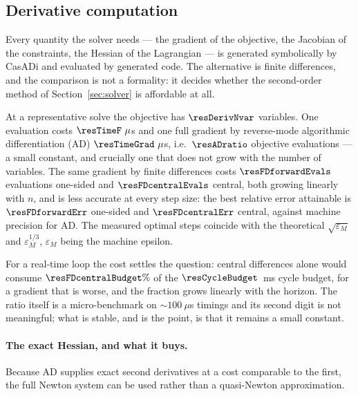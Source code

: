 \documentclass[11pt,a4paper]{article}
\begin{document}
\subsection{Derivative computation}
\label{sec:deriv}

Every quantity the solver needs --- the gradient of the objective, the Jacobian of the constraints, the
Hessian of the Lagrangian --- is generated symbolically by CasADi and evaluated by generated code. The
alternative is finite differences, and the comparison is not a formality: it decides whether the second-order
method of Section~\ref{sec:solver} is affordable at all.

\begin{table}[htbp]
  \centering
  \small
  \caption{Accuracy of the finite-difference gradient against the step size, measured against the AD gradient. The optimum sits at $h=1.49\times 10^{-8}$ one-sided (theory: $\sqrt{\varepsilon}=1.49\times 10^{-8}$) and $h=6.06\times 10^{-6}$ central (theory: $\varepsilon^{1/3}=6.06\times 10^{-6}$).}
  \label{res:tab:fd}
\end{table}

At a representative solve the objective has $\resDerivNvar$ variables. One evaluation costs
$\resTimeF~\mu$s and one full gradient by reverse-mode algorithmic differentiation (AD) $\resTimeGrad~\mu$s,
i.e.\ $\resADratio$ objective evaluations --- a small constant, and crucially one that does not grow with the
number of variables. The same gradient by finite differences costs $\resFDforwardEvals$ evaluations one-sided
and $\resFDcentralEvals$ central, both growing linearly with $n$, and is less accurate at every step size:
the best relative error attainable is $\resFDforwardErr$ one-sided and $\resFDcentralErr$ central, against
machine precision for AD. The measured optimal steps coincide with the theoretical $\sqrt{\varepsilon_M}$ and
$\varepsilon_M^{1/3}$, $\varepsilon_M$ being the machine epsilon.

For a real-time loop the cost settles the question: central differences alone would consume
$\resFDcentralBudget\%$ of the $\resCycleBudget$~ms cycle budget, for a gradient that is worse, and the
fraction grows linearly with the horizon. The ratio itself is a micro-benchmark on
$\sim\!100~\mu$s timings and its second digit is not meaningful; what is stable, and is the point, is that it
remains a small constant.

\paragraph{The exact Hessian, and what it buys.} Because AD supplies exact second derivatives at a cost
comparable to the first, the full Newton system can be used rather than a quasi-Newton approximation.
\end{document}
